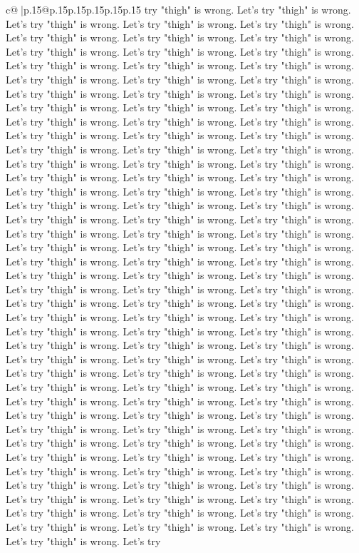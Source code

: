 \documentclass{article}
\begin{document}
{\begin{supertabular}{c@{$\;$}|p{.15\linewidth}@{}p{.15\linewidth}p{.15\linewidth}p{.15\linewidth}p{.15\linewidth}p{.15\linewidth}}
{{{try "thigh" is wrong. Let's try "thigh" is wrong. Let's try "thigh" is wrong. Let's try "thigh" is wrong. Let's try "thigh" is wrong. Let's try "thigh" is wrong. Let's try "thigh" is wrong. Let's try "thigh" is wrong. Let's try "thigh" is wrong. Let's try "thigh" is wrong. Let's try "thigh" is wrong. Let's try "thigh" is wrong. Let's try "thigh" is wrong. Let's try "thigh" is wrong. Let's try "thigh" is wrong. Let's try "thigh" is wrong. Let's try "thigh" is wrong. Let's try "thigh" is wrong. Let's try "thigh" is wrong. Let's try "thigh" is wrong. Let's try "thigh" is wrong. Let's try "thigh" is wrong. Let's try "thigh" is wrong. Let's try "thigh" is wrong. Let's try "thigh" is wrong. Let's try "thigh" is wrong. Let's try "thigh" is wrong. Let's try "thigh" is wrong. Let's try "thigh" is wrong. Let's try "thigh" is wrong. Let's try "thigh" is wrong. Let's try "thigh" is wrong. Let's try "thigh" is wrong. Let's try "thigh" is wrong. Let's try "thigh" is wrong. Let's try "thigh" is wrong. Let's try "thigh" is wrong. Let's try "thigh" is wrong. Let's try "thigh" is wrong. Let's try "thigh" is wrong. Let's try "thigh" is wrong. Let's try "thigh" is wrong. Let's try "thigh" is wrong. Let's try "thigh" is wrong. Let's try "thigh" is wrong. Let's try "thigh" is wrong. Let's try "thigh" is wrong. Let's try "thigh" is wrong. Let's try "thigh" is wrong. Let's try "thigh" is wrong. Let's try "thigh" is wrong. Let's try "thigh" is wrong. Let's try "thigh" is wrong. Let's try "thigh" is wrong. Let's try "thigh" is wrong. Let's try "thigh" is wrong. Let's try "thigh" is wrong. Let's try "thigh" is wrong. Let's try "thigh" is wrong. Let's try "thigh" is wrong. Let's try "thigh" is wrong. Let's try "thigh" is wrong. Let's try "thigh" is wrong. Let's try "thigh" is wrong. Let's try "thigh" is wrong. Let's try "thigh" is wrong. Let's try "thigh" is wrong. Let's try "thigh" is wrong. Let's try "thigh" is wrong. Let's try "thigh" is wrong. Let's try "thigh" is wrong. Let's try "thigh" is wrong. Let's try "thigh" is wrong. Let's try "thigh" is wrong. Let's try "thigh" is wrong. Let's try "thigh" is wrong. Let's try "thigh" is wrong. Let's try "thigh" is wrong. Let's try "thigh" is wrong. Let's try "thigh" is wrong. Let's try "thigh" is wrong. Let's try "thigh" is wrong. Let's try "thigh" is wrong. Let's try "thigh" is wrong. Let's try "thigh" is wrong. Let's try "thigh" is wrong. Let's try "thigh" is wrong. Let's try "thigh" is wrong. Let's try "thigh" is wrong. Let's try "thigh" is wrong. Let's try "thigh" is wrong. Let's try "thigh" is wrong. Let's try "thigh" is wrong. Let's try "thigh" is wrong. Let's try "thigh" is wrong. Let's try "thigh" is wrong. Let's try "thigh" is wrong. Let's try "thigh" is wrong. Let's try "thigh" is wrong. Let's try "thigh" is wrong. Let's try "thigh" is wrong. Let's try "thigh" is wrong. Let's try "thigh" is wrong. Let's try "thigh" is wrong. Let's try "thigh" is wrong. Let's try "thigh" is wrong. Let's try "thigh" is wrong. Let's try "thigh" is wrong. Let's try "thigh" is wrong. Let's try "thigh" is wrong. Let's try "thigh" is wrong. Let's try "thigh" is wrong. Let's try "thigh" is wrong. Let's try "thigh" is wrong. Let's try }}}
\end{supertabular}}
\end{document}
